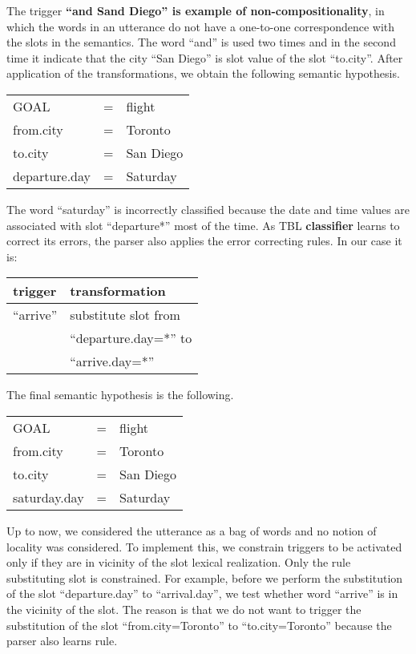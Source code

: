 \documentclass[11pt]{article}
\begin{document}
The trigger \textbf{``and Sand Diego'' is example of non-compositionality}, in which the words in an utterance do not have a one-to-one correspondence with the slots in the semantics. The word ``and'' is used two times and in the second time it indicate that the city ``San Diego'' is slot value of the slot ``to.city''. After application of the transformations, we obtain the following semantic hypothesis. 

\vspace{.25cm}
\begin{tabular}{lll}
  GOAL          & = & flight \\
  from.city     & = & Toronto \\
  to.city       & = & San Diego \\
  departure.day & = & Saturday \\
\end{tabular} 
\vspace{.25cm}

The word ``saturday'' is incorrectly classified because the date and time values are associated with slot ``departure*'' most of the time.  As TBL \textbf{classifier} learns to correct its errors, the parser also applies the error correcting rules. In our case it is:

\vspace{.25cm}
\begin{tabular}{ll}
  trigger & transformation \\
  \hline 
  ``arrive''            & substitute slot from\\
                        & ``departure.day=*'' to \\
                        & ``arrive.day=*'' \\
\end{tabular} 
\vspace{.25cm}

The final semantic hypothesis is the following.

\vspace{.25cm}
\begin{tabular}{lll}
  GOAL          & = & flight \\
  from.city     & = & Toronto \\
  to.city       & = & San Diego \\
  saturday.day & = & Saturday \\
\end{tabular} 
\vspace{.25cm}

Up to now, we considered the utterance as a bag of words and no notion of locality was considered. To implement this, we constrain triggers to be activated only if they are in vicinity of the slot lexical realization. Only the rule substituting slot is constrained. For example, before we perform the substitution of the slot ``departure.day'' to ``arrival.day'', we test whether word ``arrive'' is in the vicinity of the slot. The reason is that we do not want to trigger the substitution of the slot ``from.city=Toronto'' to ``to.city=Toronto'' because the parser also learns rule.
\end{document}
